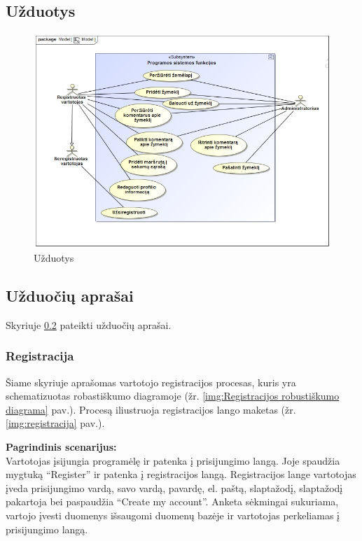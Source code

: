 \documentclass{VUMIFPSkursinis}
\begin{document}
\subsection{Užduotys}
	\begin{figure}[H]
				\centering
				\includegraphics[scale=0.5]{img/uzduotys}
				\caption{Užduotys}
				\label{img:uzduotys}
			\end{figure}

\subsection{Užduočių aprašai}
\label{sec:Užduočių aprašai}
Skyriuje \ref{sec:Užduočių aprašai} pateikti užduočių aprašai.
\subsubsection{Registracija}
	Šiame skyriuje aprašomas vartotojo registracijos procesas, kuris yra schematizuotas robastiškumo diagramoje (žr. \ref{img:Registracijos robustiškumo diagrama} pav.). 
	Procesą iliustruoja registracijos lango maketas (žr. \ref{img:registracija} pav.).

	\textbf{Pagrindinis scenarijus:}\\
	Vartotojas įsijungia programėlę ir patenka į prisijungimo langą. Joje spaudžia mygtuką “Register” ir patenka į registracijos langą. 
	Registracijos lange vartotojas įveda prisijungimo vardą, savo vardą, pavardę, el. paštą, slaptažodį, slaptažodį pakartoja bei paspaudžia 
	“Create my account”. Anketa sėkmingai sukuriama, vartojo įvesti duomenys išsaugomi duomenų bazėje ir vartotojas perkeliamas į prisijungimo langą.
\end{document}
